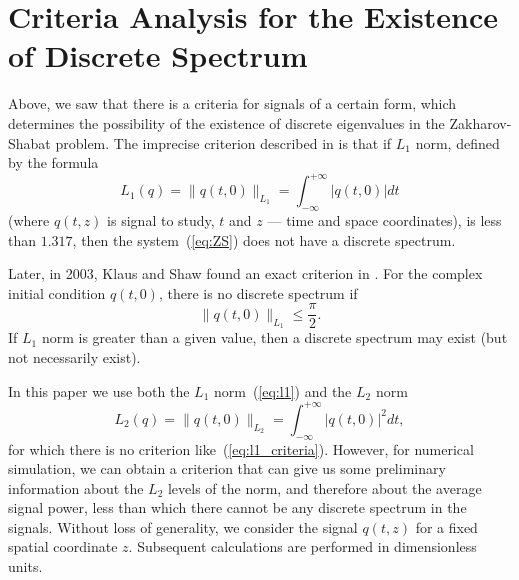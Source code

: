 \section{Criteria Analysis for the Existence of Discrete Spectrum}

Above, we saw that there is a criteria for signals of a certain form, which determines the possibility of the existence of discrete eigenvalues in the Zakharov-Shabat problem. The imprecise criterion described in \cite{novikov1984theory} is that if $L_1$ norm, defined by the formula 
\begin{equation}
    L_1(q) = \lVert q (t, 0) \rVert_{L_1} = \int^{+ \infty}_{ - \infty} | q (t, 0) | dt  
    \label{eq:l1}
\end{equation}
(where $q(t,z)$ is signal to study, $t$ and $z$ --- time and space coordinates),
is less than $ 1.317 $, then the system~(\ref{eq:ZS}) does not have a discrete spectrum.

Later, in 2003, Klaus and Shaw found an exact criterion in \cite{klaus2003}.
For the complex initial condition $q (t, 0)$, there is no discrete spectrum if
\begin{equation}
    \lVert q(t, 0) \rVert_{L_1} \leq \frac{\pi}{2} {.}
    \label{eq:l1_criteria}
\end{equation}
If $ L_1 $ norm is greater than a given value, then a discrete spectrum may exist (but not necessarily exist).

In this paper we use both the $ L_1 $ norm~(\ref{eq:l1}) and the $ L_2 $ norm
\begin{equation}
    L_2(q) = \lVert q (t, 0) \rVert_{L_2} = \int^{+ \infty}_{ - \infty} | q (t, 0) |^2 dt {,} 
    \label{eq:l2}
\end{equation}
for which there is no criterion like~(\ref{eq:l1_criteria}). However, for numerical simulation, we can obtain a criterion that can give us some preliminary information about the $L_2$ levels of the norm, and therefore about the average signal power, less than which there cannot be any discrete spectrum in the signals. Without loss of generality, we consider the signal $q (t, z)$ for a fixed spatial coordinate $z$. Subsequent calculations are performed in dimensionless units.

